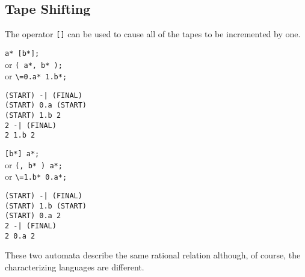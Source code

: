 \subsection{Tape Shifting}
The operator \verb#[]# can be used to cause all of the tapes to be
incremented by one.
\begin{center}\begin{minipage}[t]{3in}\begin{minipage}[t]{3in}\begin{tabbing}
\qquad \= \verb#a* [b*];#\\
or \> \verb#( a*, b* );#\\
or \> \verb#\=0.a* 1.b*;#
\end{tabbing}\end{minipage}\end{minipage}
\begin{minipage}[t]{1.6in}\begin{verbatim}
(START) -| (FINAL)
(START) 0.a (START)
(START) 1.b 2
2 -| (FINAL)
2 1.b 2
\end{verbatim}\end{minipage}\end{center}
\begin{center}\begin{minipage}[t]{3in}\begin{minipage}[t]{3in}\begin{tabbing}
\qquad \= \verb#[b*] a*;#\\
or \> \verb#(, b* ) a*;#\\
or \> \verb#\=1.b* 0.a*;#
\end{tabbing}\end{minipage}\end{minipage}
\begin{minipage}[t]{1.6in}\begin{verbatim}
(START) -| (FINAL)
(START) 1.b (START)
(START) 0.a 2
2 -| (FINAL)
2 0.a 2
\end{verbatim}\end{minipage}\end{center}
These two automata describe the same rational relation although, of course,
the characterizing languages are different.

